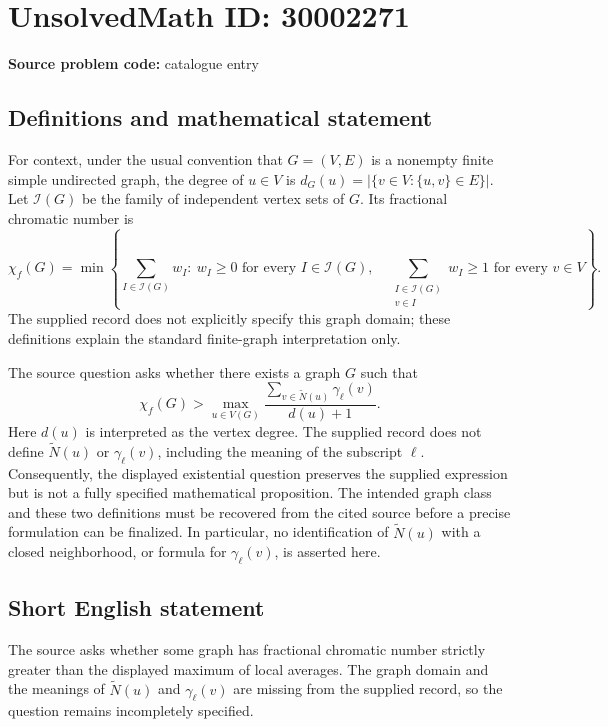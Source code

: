 \documentclass[11pt]{article}
\begin{document}
\section*{UnsolvedMath ID: 30002271}
\textbf{Source problem code:} catalogue entry
\subsection{Definitions and mathematical statement}
For context, under the usual convention that \(G=(V,E)\) is a nonempty finite simple undirected graph, the degree of \(u\in V\) is \(d_G(u)=|\{v\in V:\{u,v\}\in E\}|\). Let \(\mathcal I(G)\) be the family of independent vertex sets of \(G\). Its fractional chromatic number is
\[
\chi_f(G)=\min\left\{\sum_{I\in\mathcal I(G)}w_I:\ w_I\geq 0\text{ for every }I\in\mathcal I(G),\quad \sum_{\substack{I\in\mathcal I(G)\\v\in I}}w_I\geq 1\text{ for every }v\in V\right\}.
\]
The supplied record does not explicitly specify this graph domain; these definitions explain the standard finite-graph interpretation only.

The source question asks whether there exists a graph \(G\) such that
\[
\chi_f(G)>\max_{u\in V(G)}\frac{\displaystyle\sum_{v\in\widetilde N(u)}\gamma_\ell(v)}{d(u)+1}.
\]
Here \(d(u)\) is interpreted as the vertex degree. The supplied record does not define \(\widetilde N(u)\) or \(\gamma_\ell(v)\), including the meaning of the subscript \(\ell\). Consequently, the displayed existential question preserves the supplied expression but is not a fully specified mathematical proposition. The intended graph class and these two definitions must be recovered from the cited source before a precise formulation can be finalized. In particular, no identification of \(\widetilde N(u)\) with a closed neighborhood, or formula for \(\gamma_\ell(v)\), is asserted here.
\subsection{Short English statement}
The source asks whether some graph has fractional chromatic number strictly greater than the displayed maximum of local averages. The graph domain and the meanings of \(\widetilde N(u)\) and \(\gamma_\ell(v)\) are missing from the supplied record, so the question remains incompletely specified.
\end{document}
